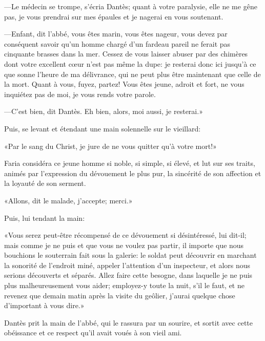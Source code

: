 —Le médecin se trompe, s'écria Dantès; quant à votre paralysie, elle ne me gêne pas, je vous prendrai sur mes épaules et je nagerai en vous soutenant.

—Enfant, dit l'abbé, vous êtes marin, vous êtes nageur, vous devez par conséquent savoir qu'un homme chargé d'un fardeau pareil ne ferait pas cinquante brasses dans la mer. Cessez de vous laisser abuser par des chimères dont votre excellent cœur n'est pas même la dupe: je resterai donc ici jusqu'à ce que sonne l'heure de ma délivrance, qui ne peut plus être maintenant que celle de la mort. Quant à vous, fuyez, partez! Vous êtes jeune, adroit et fort, ne vous inquiétez pas de moi, je vous rends votre parole.

—C'est bien, dit Dantès. Eh bien, alors, moi aussi, je resterai.»

Puis, se levant et étendant une main solennelle sur le vieillard:

«Par le sang du Christ, je jure de ne vous quitter qu'à votre mort!»

Faria considéra ce jeune homme si noble, si simple, si élevé, et lut sur ses traits, animés par l'expression du dévouement le plus pur, la sincérité de son affection et la loyauté de son serment.

«Allons, dit le malade, j'accepte; merci.»

Puis, lui tendant la main:

«Vous serez peut-être récompensé de ce dévouement si désintéressé, lui dit-il; mais comme je ne puis et que vous ne voulez pas partir, il importe que nous bouchions le souterrain fait sous la galerie: le soldat peut découvrir en marchant la sonorité de l'endroit miné, appeler l'attention d'un inspecteur, et alors nous serions découverts et séparés. Allez faire cette besogne, dans laquelle je ne puis plus malheureusement vous aider; employez-y toute la nuit, s'il le faut, et ne revenez que demain matin après la visite du geôlier, j'aurai quelque chose d'important à vous dire.»

Dantès prit la main de l'abbé, qui le rassura par un sourire, et sortit avec cette obéissance et ce respect qu'il avait voués à son vieil ami.



